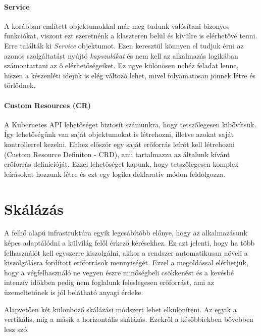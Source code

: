 \paragraph{Service}
A korábban említett objektumokkal már meg tudunk valósítani bizonyos funkciókat, viszont ezt szeretnénk a klaszteren belül és kívülre is elérhetővé tenni. Erre találták ki \textit{Service} objektumot. Ezen keresztül könnyen el tudjuk érni az azonos szolgáltatást nyújtó \textit{kapszulákat} és nem kell az alkalmazás logikában számontartani az ő elérhetőségeiket. Ez ugye különösen nehéz feladat lenne, hiszen a készenléti idejük is elég változó lehet, mivel folyamatosan jönnek létre és törlődnek.

\paragraph{Custom Resources (CR)}
A Kubernetes API lehetőséget biztosít számunkra, hogy tetszőlegesen kibővítsük. Így lehetőségünk van
saját objektumokat is létrehozni, illetve azokat saját kontrollerrel kezelni. Ehhez először egy
saját erőforrás leírót kell létrehozni (Custom Resource Definiton - CRD), ami tartalmazza az
általunk kívánt erőforrás definícióját. Ezzel lehetőséget kapunk, hogy tetszőlegesen komplex
leírásokat hozzunk létre és ezt egy logika deklaratív módon feldolgozza.

\section{Skálázás}
A felhő alapú infrastruktúra egyik legcsábítóbb előnye, hogy az alkalmazásunk képes adaptálódni a külvilág felől érkező kérésekhez. Ez azt jelenti, hogy ha több felhasználót kell egyszerre kiszolgálni, akkor a rendszer automatikusan növeli a kiszolgálásra fordított erőforrások mennyiségét. Ezzel a megoldással elérhetjük, hogy a végfelhasználó ne vegyen észre minőségbeli csökkenést és a kevésbé intenzív időkben pedig nem foglalunk feleslegesen erőforrást, ami az üzemeltetőnek is jól belátható anyagi érdeke.
 
Alapvetően két különböző skálázási módszert lehet elkülöníteni. Az egyik a vertikális, míg a másik a horizontális skálázás. Ezekről a későbbiekben bővebben lesz szó. 

